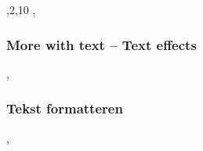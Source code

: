 \copyrightVincent


\def\extraslistsep{\hspace{0.5em}\textcolor{red!80!black}{\vrule width 1pt height 0.6\baselineskip\relax}\hspace{0.5em}}

\def\frameSelection{10}

    \def\frameSelection{1,2,10}
\endDetail

\beginFrameWithSelection\frameSelection
    \lang,\frametitle{More with text -- Text effects},\frametitle{Tekst formatteren},
    
